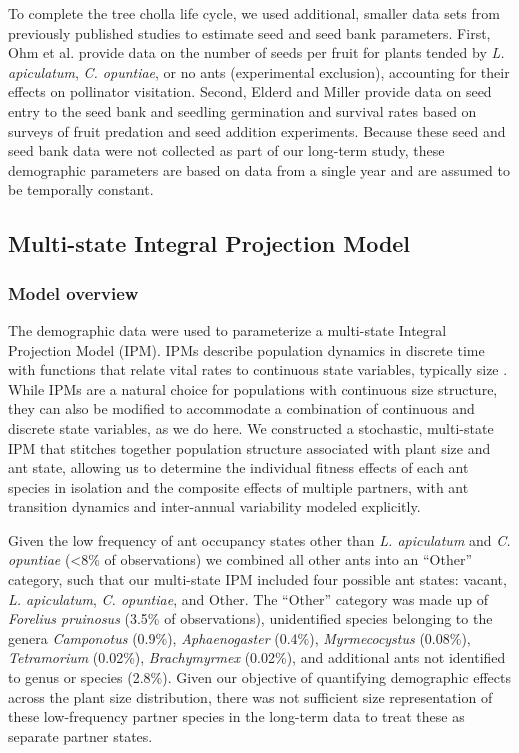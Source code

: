 \documentclass[11pt]{article}
\begin{document}
To complete the tree cholla life cycle, we used additional, smaller data sets from previously published studies to estimate seed and seed bank parameters. 
First, Ohm et al. \citeyear{Ohm2014} provide data on the number of seeds per fruit for plants tended by \textit{L. apiculatum}, \textit{C. opuntiae}, or no ants (experimental exclusion), accounting for their effects on pollinator visitation. 
Second, Elderd and Miller \citeyear{elderd2016quantifying} provide data on seed entry to the seed bank and seedling germination and survival rates based on surveys of fruit predation and seed addition experiments. 
Because these seed and seed bank data were not collected as part of our long-term study, these demographic parameters are based on data from a single year and are assumed to be temporally constant. 

\subsection*{Multi-state Integral Projection Model}
\subsubsection*{Model overview}
The demographic data were used to parameterize a multi-state Integral Projection Model (IPM).
IPMs describe population dynamics in discrete time with functions that relate vital rates to continuous state variables, typically size \citep{ellnerbook}. 
While IPMs are a natural choice for populations with continuous size structure, they can also be modified to accommodate a combination of continuous and discrete state variables, as we do here. 
We constructed a stochastic, multi-state IPM that stitches together population structure associated with plant size and ant state, allowing us to determine the individual fitness effects of each ant species in isolation and the composite effects of multiple partners, with ant transition dynamics and inter-annual variability modeled explicitly.

Given the low frequency of ant occupancy states other than \textit{L. apiculatum} and \textit{C. opuntiae} (\textless8\% of observations) we combined all other ants into an ``Other'' category, such that our multi-state IPM included four possible ant states: vacant, \textit{L. apiculatum}, \textit{C. opuntiae}, and Other. 
The ``Other'' category was made up of \textit{Forelius pruinosus} (3.5\% of observations), unidentified species belonging to the genera \textit{Camponotus} (0.9\%), \textit{Aphaenogaster} (0.4\%), \textit{Myrmecocystus} (0.08\%), \textit{Tetramorium} (0.02\%), \textit{Brachymyrmex} (0.02\%), and additional ants not identified to genus or species (2.8\%). 
Given our objective of quantifying demographic effects across the plant size distribution, there was not sufficient size representation of these low-frequency partner species in the long-term data to treat these as separate partner states.  
\end{document}
